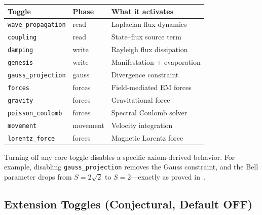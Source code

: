\documentclass[11pt,a4paper]{article}
\theoremstyle{compact}
\begin{document}
\begin{center}
\small
\begin{tabular}{lll}
\toprule
\textbf{Toggle} & \textbf{Phase} & \textbf{What it activates} \\
\midrule
\texttt{wave\_propagation} & read & Laplacian flux dynamics \\
\texttt{coupling} & read & State--flux source term \\
\texttt{damping} & write & Rayleigh flux dissipation \\
\texttt{genesis} & write & Manifestation + evaporation \\
\texttt{gauss\_projection} & gauss & Divergence constraint \\
\texttt{forces} & forces & Field-mediated EM forces \\
\texttt{gravity} & forces & Gravitational force \\
\texttt{poisson\_coulomb} & forces & Spectral Coulomb solver \\
\texttt{movement} & movement & Velocity integration \\
\texttt{lorentz\_force} & forces & Magnetic Lorentz force \\
\bottomrule
\end{tabular}
\end{center}

Turning off any core toggle disables a specific axiom-derived behavior. For example, disabling \texttt{gauss\_projection} removes the Gauss constraint, and the Bell parameter drops from $S = 2\sqrt{2}$ to $S = 2$---exactly as proved in~\cite{lifecycle}.

\subsection*{Extension Toggles (Conjectural, Default OFF)}
\end{document}
